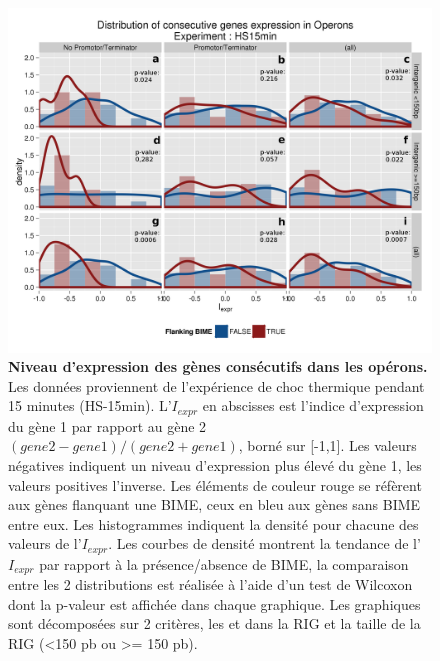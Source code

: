 \documentclass[12pt,a4paper]{report}
\begin{document}
\begin{onehalfspace}
\begin{figure}[!h]
\centerline{\includegraphics[scale=0.82]{figures/genesOperon_histoDens.png}}
\caption{\textbf{Niveau d'expression des gènes consécutifs dans les opérons.} Les données proviennent de l'expérience de choc thermique pendant 15 minutes (HS-15min). L'$I_{expr}$ en abscisses est l'indice d'expression du gène 1 par rapport au gène 2 $(gene2 - gene1) / (gene2 + gene1)$, borné sur [-1,1]. Les valeurs négatives indiquent un niveau d'expression plus élevé du gène 1, les valeurs positives l'inverse. Les éléments de couleur rouge se réfèrent aux gènes flanquant une BIME, ceux en bleu aux gènes sans BIME entre eux. Les histogrammes indiquent la densité pour chacune des valeurs de l'$I_{expr}$. Les courbes de densité montrent la tendance de l'$I_{expr}$ par rapport à la présence/absence de BIME, la comparaison entre les 2 distributions est réalisée à l'aide d'un test de Wilcoxon dont la p-valeur est affichée dans chaque graphique. Les graphiques sont décomposées sur 2 critères, les \gls{et} dans la RIG et la taille de la RIG (<150 pb ou >= 150 pb).}
\label{fig:expression_operon}
\end{figure}


\end{onehalfspace}
\end{document}
